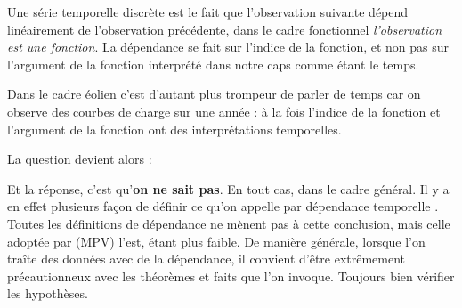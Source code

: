 
Une série temporelle discrète est le fait que l'observation suivante dépend linéairement de l'observation précédente, dans le cadre fonctionnel \emph{l'observation est une fonction}. La dépendance se fait sur l'indice de la fonction, et non pas sur l'argument de la fonction interprété dans notre caps comme étant le temps.

\bigskip

Dans le cadre éolien c'est d'autant plus trompeur de parler de temps car on observe des courbes de charge sur une année : à la fois l'indice de la fonction et l'argument de la fonction ont des interprétations temporelles.

\smallskip

\noindent{}

\bigskip

\noindent La question devient alors :

\noindent Et la réponse, c'est qu'\textbf{on ne sait pas}. En tout cas, dans le cadre général. Il y a en effet plusieurs façon de définir ce qu'on appelle par \og dépendance temporelle \fg. Toutes les définitions de dépendance ne mènent pas à cette conclusion, mais celle adoptée par (MPV) l'est, étant plus faible. De manière générale, lorsque l'on traîte des données avec de la dépendance, il convient d'être extrêmement précautionneux avec les théorèmes et \og faits \fg que l'on invoque. Toujours bien vérifier les hypothèses.